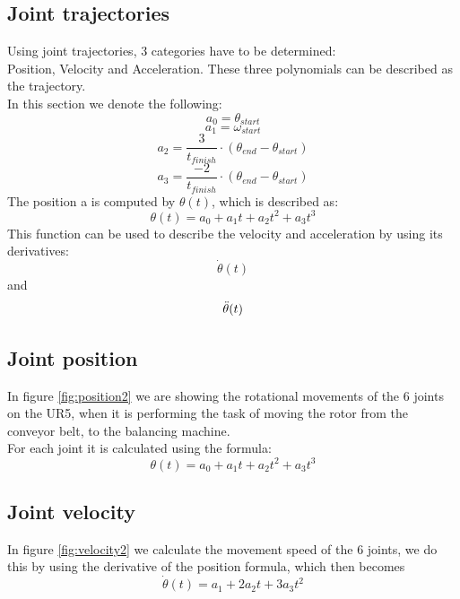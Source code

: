 \subsection{Joint trajectories}

Using joint trajectories, 3 categories have to be determined:\\
Position, Velocity and Acceleration.
These three polynomials can be described as the trajectory.\\
In this section we denote the following:
\begin{equation}
    a_0 =\theta_{start} 
\end{equation}
\begin{equation}
    a_1 = \omega_{start}
\end{equation}
\begin{equation}
    a_2 = \frac{3}{t_{finish}} \cdot (\theta_{end} - \theta_{start})
\end{equation}
\begin{equation}
    a_3 = \frac{-2}{t_{finish}} \cdot (\theta_{end} - \theta_{start})
\end{equation}
The position a is computed by \(\theta(t)\), which is described as: \[\theta(t)=a_0+a_1t+a_2t^2+a_3t^3\]
This function can be used to describe the velocity and acceleration by using its derivatives\cite{JointTrajectories}:\[\Dot{\theta}(t)\] and \[\Ddot{\theta}(t)\]

\subsection{Joint position}
In figure \ref{fig:position2} we are showing the rotational movements of the 6 joints on the UR5, when it is performing the task of moving the rotor from the conveyor belt, to the balancing machine.\\
For each joint it is calculated using the formula: 
\begin{equation}
  \theta(t)=a_0+a_1t+a_2t^2+a_3t^3
\end{equation}

\subsection{Joint velocity}
In figure \ref{fig:velocity2} we calculate the movement speed of the 6 joints, we do this by using the derivative of the position formula, which then becomes
\begin{equation}
\Dot{\theta}(t)=a_1+2a_2t+3a_3t^2
\end{equation}

